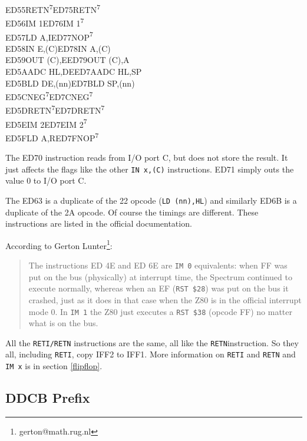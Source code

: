 \documentclass[12pt,twoside,openright,a4paper]{book}
\newcommand{\See}[1]{\textsuperscript{#1}}
\begin{document}
{\begin{tabbing}
		{\qquad}ED55\>RETN{\See{7}}\>ED75\>RETN{\See{7}}\\
		{\qquad}ED56\>IM 1\>ED76\>IM 1{\See{7}}\\
		{\qquad}ED57\>LD A,I\>ED77\>NOP{\See{7}}\\
		{\qquad}ED58\>IN E,(C)\>ED78\>IN A,(C)\\
		{\qquad}ED59\>OUT (C),E\>ED79\>OUT (C),A\\
		{\qquad}ED5A\>ADC HL,DE\>ED7A\>ADC HL,SP\\
		{\qquad}ED5B\>LD DE,(nn)\>ED7B\>LD SP,(nn)\\
		{\qquad}ED5C\>NEG{\See{7}}\>ED7C\>NEG{\See{7}}\\
		{\qquad}ED5D\>RETN{\See{7}}\>ED7D\>RETN{\See{7}}\\
		{\qquad}ED5E\>IM 2\>ED7E\>IM 2{\See{7}}\\
		{\qquad}ED5F\>LD A,R\>ED7F\>NOP{\See{7}}\\
	\end{tabbing}
}
\renewcommand{\thefootnote}{\arabic{footnote}}

The ED70 instruction reads from I/O port C, but does not store the result. It just affects the flags like the other {\tt IN x,(C)} instructions. ED71 simply outs the value 0 to I/O port C.

The ED63 is a duplicate of the 22 opcode ({\tt LD (nn),HL}) and similarly ED6B is a duplicate of the 2A opcode. Of course the timings are different. These instructions are listed in the official documentation.

According to Gerton Lunter\footnote{gerton@math.rug.nl}:

\begin{quote}
	The instructions ED 4E and ED 6E are {\tt IM 0} equivalents: when FF was put on the bus (physically) at interrupt time, the Spectrum continued to execute normally, whereas when an EF ({\tt RST \$28}) was put on the bus it crashed, just as it does in that case when the Z80 is in the official interrupt mode 0. In {\tt IM 1} the Z80 just executes a {\tt RST \$38} (opcode FF) no matter what is on the bus.
\end{quote}

All the {\tt RETI/RETN} instructions are the same, all like the {\tt RETN}instruction. So they all, including {\tt RETI}, copy IFF2 to IFF1. More information on {\tt RETI} and {\tt RETN} and {\tt IM x} is in section \ref{flipflop}.


\subsection{DDCB Prefix}
\label{prefix_cbdd}
\end{document}
